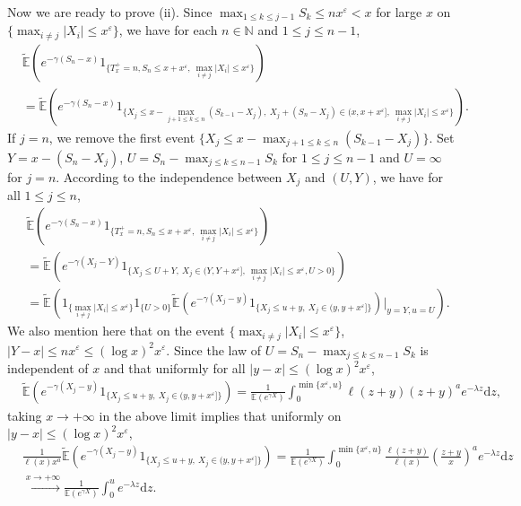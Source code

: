 \documentclass[10pt,a4paper]{amsart}
\numberwithin{equation}{section}
\begin{document}
Now we are ready to prove (ii). Since $\max_{1\leq k\leq j-1}S_k \leq n x^\varepsilon <x$ for large $x$ on $\{\max_{i\neq j} |X_i| \leq x^{\varepsilon}\}$, we have for each $n\in \mathbb{N}$ and $1\leq j\leq n-1$, 
\begin{align}\label{e19}
	& \widetilde{\mathbb{E}}\left(e^{-\gamma (S_n-x)}1_{\{T_x^+=n, S_n\leq x+x^\varepsilon, \ \max_{i\neq j} |X_i| \leq x^{\varepsilon}  \}}\right) \nonumber\\
	& =  \widetilde{\mathbb{E}}\left(e^{-\gamma (S_n-x)}1_{\{ X_j \leq x-\max_{j+1\leq k\leq n}(S_{k-1}-X_j),\  X_j + (S_n-X_j) \in (x,x+x^\varepsilon], \ \max_{i\neq j} |X_i| \leq x^{\varepsilon}  \}}\right). 
\end{align}
If $j=n$, we  remove the first event $\{ X_j \leq x-\max_{j+1\leq k\leq n}(S_{k-1}-X_j)\}$. 
 Set $Y=x-( S_n-X_j)$, $U=S_n- \max_{j\leq k\leq n-1} S_k$ for $1\leq j \leq n-1$ and $U=\infty$ for $j=n$. According to the independence between $X_j$ and $(U, Y)$, we have for all $1\leq j\leq n$, 
 \begin{align}
 		& \widetilde{\mathbb{E}}\left(e^{-\gamma (S_n-x)}1_{\{T_x^+=n, S_n\leq x+x^\varepsilon, \ \max_{i\neq j} |X_i| \leq x^{\varepsilon}  \}}\right) \nonumber\\
 	& =  \widetilde{\mathbb{E}}\left(e^{-\gamma (X_j-Y)} 1_{\{ X_j \leq U+Y,\  X_j  \in (Y,Y+x^\varepsilon], \ \max_{i\neq j} |X_i| \leq x^{\varepsilon} , U>0 \}}\right)\nonumber\\
 	& = \widetilde{\mathbb{E}}\left(1_{\{\max_{i\neq j} |X_i| \leq x^{\varepsilon} \}} 1_{\{U>0\}}\widetilde{\mathbb{E}}\left(e^{-\gamma (X_j-y)}1_{\{ X_j \leq u+y,\  X_j  \in (y,y+x^\varepsilon] \}}\right)\Big|_{y=Y, u=U}\right).
 \end{align}
We also mention here that on the event $\{\max_{i\neq j} |X_i| \leq x^{\varepsilon} \}$,  $ |Y-x| \leq n x^\varepsilon \leq (\log x)^2 x^\varepsilon$.  Since  the law of $U= S_n- \max_{j\leq k\leq n-1} S_k$ is independent of $x$ and that  uniformly for all $|y-x| \leq (\log x)^2 x^\varepsilon$,
\begin{align}
	 & \widetilde{\mathbb{E}}\left(e^{-\gamma (X_j-y)}1_{\{ X_j \leq u+y,\  X_j  \in (y,y+x^\varepsilon] \}}\right)  = \frac{1}{\mathbb{E}(e^{\gamma X})}\int_0^{\min\{x^{\varepsilon}, u\} } \ell(z+y) (z+y)^a e^{-\lambda z} \mathrm{d}z,
\end{align}
 taking $x\to+\infty$ in the above limit implies that uniformly on $|y-x| \leq (\log x)^2 x^\varepsilon$,
\begin{align}
	& \frac{ 1 }{\ell(x)x^a}\widetilde{\mathbb{E}}\left(e^{-\gamma (X_j-y)}1_{\{ X_j \leq u+y,\  X_j  \in (y,y+x^\varepsilon] \}}\right)= \frac{1}{\mathbb{E}(e^{\gamma X})}\int_0^{\min\{ x^{\varepsilon}, u\} }\frac{ \ell(z+y)}{\ell (x)} \left(\frac{z+y}{x}\right)^a e^{-\lambda z} \mathrm{d}z \nonumber\\
	 & \stackrel{x\to+\infty}{\longrightarrow} \frac{1}{\mathbb{E}(e^{\gamma X})} \int_0^ue^{-\lambda z}\mathrm{d}z.
\end{align}
\end{document}
